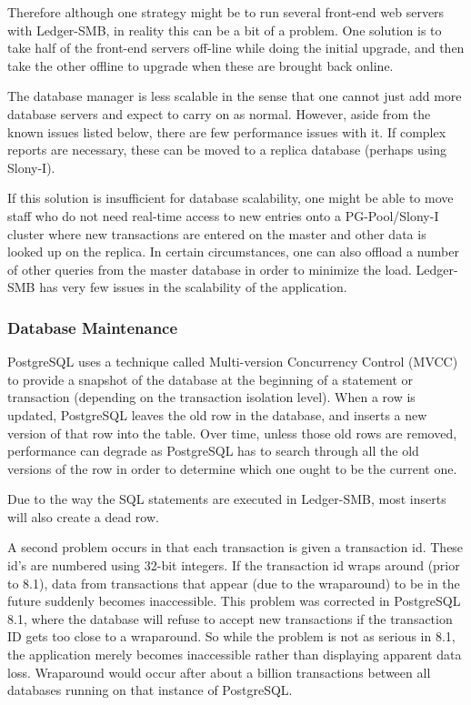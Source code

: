 \documentclass{article}
\begin{document}
Therefore although one strategy might be to run several front-end web servers
with Ledger-SMB, in reality this can be a bit of a problem.  One solution is to
take half of the front-end servers off-line while doing the initial upgrade, and
then take the other offline to upgrade when these are brought back online.

The database manager is less scalable in the sense that one cannot just add more
database servers and expect to carry on as normal.  However, aside from the 
known issues listed below, there are few performance issues with it.  If 
complex reports are necessary, these can be moved to a replica database 
(perhaps using Slony-I).

If this solution is insufficient for database scalability, one might be able to
move staff who do not need real-time access to new entries onto a
PG-Pool/Slony-I cluster where new transactions are entered on the master and
other data is looked up on the replica.  In certain circumstances, one can also
offload a number of other queries from the master database in order to minimize
the load.  Ledger-SMB has very few issues in the scalability of the application.

\subsubsection{Database Maintenance}
PostgreSQL uses a technique called Multi-version Concurrency Control (MVCC) to
provide a snapshot of the database at the beginning of a statement or
transaction (depending on the transaction isolation level).  When a row is
updated, PostgreSQL leaves the old row in the database, and inserts a new
version of that row into the table.  Over time, unless those old rows are
removed, performance can degrade as PostgreSQL has to search through all the old
versions of the row in order to determine which one ought to be the current one.

Due to the way the SQL statements are executed in Ledger-SMB, most inserts will
also create a dead row.

A second problem occurs in that each transaction is given a transaction id.
These id's are numbered using 32-bit integers.  If the transaction id wraps
around (prior to 8.1), data from transactions that appear (due to the 
wraparound) to be in the
future suddenly becomes inaccessible.  This problem was corrected in PostgreSQL
8.1, where the database will refuse to accept new transactions if the
transaction ID gets too close to a wraparound.  So while the problem is not as
serious in 8.1, the application merely becomes inaccessible rather than
displaying apparent data loss.  Wraparound would occur after
about a billion transactions between all databases running on that instance of
PostgreSQL.
\end{document}
